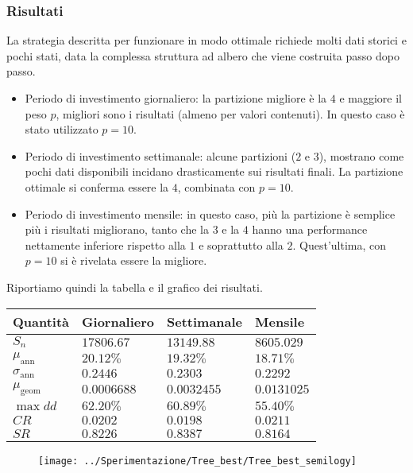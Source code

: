 \documentclass[a4paper,11pt]{book}
\theoremstyle{plain}
\theoremstyle{definition}
\theoremstyle{remark}
\begin{document}
\subsubsection{Risultati}
La strategia descritta per funzionare in modo ottimale richiede molti dati storici e pochi stati, data la complessa struttura ad albero che viene costruita passo dopo passo. 
\begin{itemize}
	\item Periodo di investimento giornaliero: la partizione migliore è la $4$ e maggiore il peso $p$, migliori sono i risultati (almeno per valori contenuti). In questo caso è stato utilizzato $p=10$.
	\item Periodo di investimento settimanale: alcune partizioni ($2$ e $3$), mostrano come pochi dati disponibili incidano drasticamente sui risultati finali. La partizione ottimale si conferma essere la $4$, combinata con $p=10$.
	\item Periodo di investimento mensile: in questo caso, più la partizione è semplice più i risultati migliorano, tanto che la $3$ e la $4$ hanno una performance nettamente inferiore rispetto alla $1$ e soprattutto alla $2$. Quest'ultima, con $p=10$ si è rivelata essere la migliore.
\end{itemize}
Riportiamo quindi la tabella e il grafico dei risultati.
\begin{table}[H]
	\centering
	\begin{tabular}{|l|l|l|l|}
		\hline
		Quantità 			  & Giornaliero	 & Settimanale	& Mensile		\\\hline
		$S_n$                 & $17806.67$   & $13149.88$	& $8605.029$ 	\\
		$\mu_{\text{ann}}$    & $20.12\%$    & $19.32\%$	& $18.71\%$		\\
		$\sigma_{\text{ann}}$ & $0.2446$     & $0.2303$		& $0.2292$		\\
		$\mu_{\text{geom}}$   & $0.0006688$  & $0.0032455$	& $0.0131025$	\\
		$\max dd$             & $62.20\%$    & $60.89\%$	& $55.40\%$		\\
		$CR$                  & $0.0202$     & $0.0198$		& $0.0211$		\\
		$SR$                  & $0.8226$     & $0.8387$		& $0.8164$		\\\hline
	\end{tabular}
\end{table}

\begin{figure}[H]
	\centering
	\texttt{[image: ../Sperimentazione/Tree\_best/Tree\_best\_semilogy]}
	\caption{}
	\label{fig:treebestsemilogy}
\end{figure}
\end{document}
